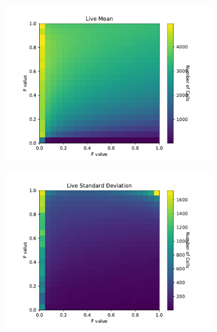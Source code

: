 \documentclass{article}
\begin{document}
\begin{figure}[H]
\centering
\begin{subfigure}{.5\textwidth}
    \centering
    \includegraphics[scale=0.4]{Live Mean.pdf}
    \label{fig:livemean}
\end{subfigure}%
\begin{subfigure}{.5\textwidth}
    \centering
    \includegraphics[scale=0.4]{Live STD.pdf}
    \label{fig:livestd}
\end{subfigure}
\label{fig:live}
\end{figure}
\end{document}
